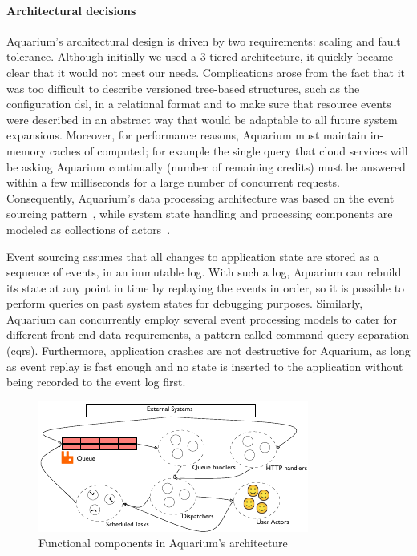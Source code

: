 \paragraph{Architectural decisions} 
Aquarium's architectural design is driven
by two requirements: scaling and fault tolerance. Although initially we used a
3-tiered architecture, it quickly became clear that it would not meet our
needs.  Complications arose from the fact that it was too difficult to describe
versioned tree-based structures, such as the configuration {\sc dsl}, in a
relational format and to make sure that resource events were described in an
abstract way that would be adaptable to all future system expansions. Moreover,
for performance reasons, Aquarium must maintain in-memory caches of computed; 
for example the
single query that cloud services will be asking Aquarium continually (number of
remaining credits) must be answered within a few milliseconds for a large
number of concurrent requests.
Consequently, Aquarium's data processing architecture was based
on the event sourcing pattern~\cite{Fowle05}, while system state handling and
processing components are modeled as collections of actors~\cite{Hewit73}.

Event sourcing assumes that all changes to application
state are stored as a sequence of events, in an immutable log. With such a log,
Aquarium can rebuild its state at any point in time by replaying the
events in order, so it is possible to perform queries on past system states for
debugging purposes. Similarly, Aquarium can concurrently employ several event
processing models to cater for different front-end data requirements, a pattern
called command-query separation ({\sc cqrs}).
Furthermore, application crashes are not destructive for Aquarium, as long as
event replay is fast enough and no state is inserted to the application without
being recorded to the event log first.

\begin{figure}
    \begin{center}
    \includegraphics[scale=1.2]{arch.pdf}
    \end{center}
\caption{Functional components in Aquarium's architecture} 
\label{fig:arch}
\end{figure}

